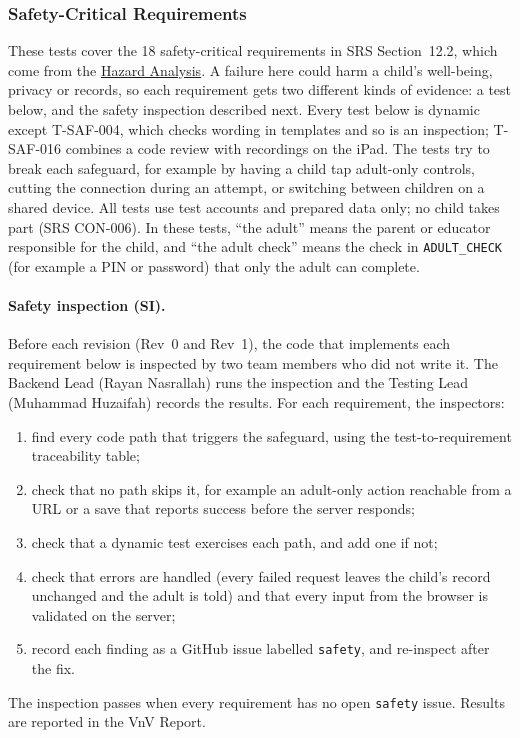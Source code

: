 \documentclass[12pt, titlepage]{article}
\begin{document}
\subsubsection{Safety-Critical Requirements}
\label{sec:safety-tests}

These tests cover the 18 safety-critical requirements in SRS Section~12.2,
which come from the \href{https://github.com/AHMEDELZARIA/squigglr/blob/main/docs/HazardAnalysis/HazardAnalysis.tex}{Hazard Analysis}. A failure here could harm a
child's well-being, privacy or records, so each requirement gets two
different kinds of evidence: a test below, and the safety inspection
described next. Every test below is dynamic except T-SAF-004, which checks
wording in templates and so is an inspection; T-SAF-016 combines a code
review with recordings on the iPad. The tests try to break each safeguard, for example by
having a child tap adult-only controls, cutting the connection during an
attempt, or switching between children on a shared device. All tests use
test accounts and prepared data only; no child takes part (SRS CON-006).
In these tests, ``the adult'' means the parent or educator responsible for
the child, and ``the adult check'' means the check in \texttt{ADULT\_CHECK}
(for example a PIN or password) that only the adult can complete.

\paragraph{Safety inspection (SI).} Before each revision (Rev~0 and
Rev~1), the code that implements each requirement below is inspected by two
team members who did not write it. The Backend Lead (Rayan Nasrallah) runs
the inspection and the Testing Lead (Muhammad Huzaifah) records the results.
For each requirement, the inspectors:
\begin{enumerate}
\item find every code path that triggers the safeguard, using the
test-to-requirement traceability table;
\item check that no path skips it, for example an adult-only action reachable
from a URL or a save that reports success before the server responds;
\item check that a dynamic test exercises each path, and add one if not;
\item check that errors are handled (every failed request leaves the
child's record unchanged and the adult is told) and that every input from
the browser is validated on the server;
\item record each finding as a GitHub issue labelled \texttt{safety}, and
re-inspect after the fix.
\end{enumerate}
The inspection passes when every requirement has no open \texttt{safety}
issue. Results are reported in the VnV Report.
\end{document}
